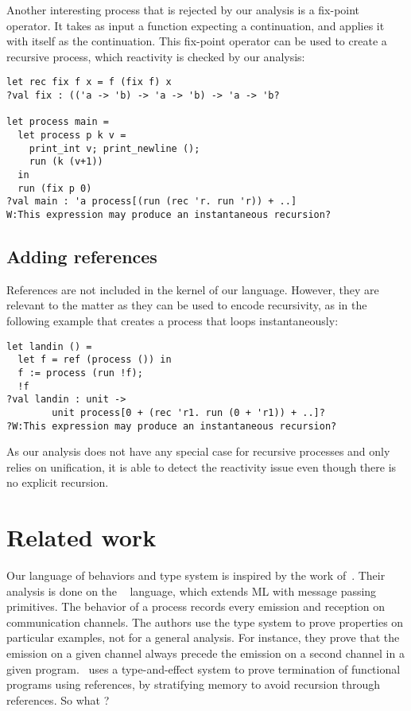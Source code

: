\documentclass[9pt,preprint]{sigplanconf}
\newcommand{\todo}[1]{ {\color{red} #1}}
\begin{document}
Another interesting process that is rejected by our analysis is a fix-point operator. It takes as input a function expecting a continuation, and applies it with itself as the continuation. This fix-point operator can be used to create a recursive process, which reactivity is checked by our analysis:
\begin{lstlisting}
let rec fix f x = f (fix f) x
?val fix : (('a -> 'b) -> 'a -> 'b) -> 'a -> 'b?

let process main =
  let process p k v =
    print_int v; print_newline (); 
    run (k (v+1))
  in
  run (fix p 0)
?val main : 'a process[(run (rec 'r. run 'r)) + ..]
W:This expression may produce an instantaneous recursion?
\end{lstlisting}

\subsection{Adding references}

References are not included in the kernel of our language. However, they are relevant to the matter as they can be used to encode recursivity, as in the following example that creates a process that loops instantaneously:
%
\begin{lstlisting}
let landin () =
  let f = ref (process ()) in
  f := process (run !f);
  !f
?val landin : unit -> 
        unit process[0 + (rec 'r1. run (0 + 'r1)) + ..]?
?W:This expression may produce an instantaneous recursion?
\end{lstlisting}
%
As our analysis does not have any special case for recursive processes and only relies on unification, it is able to detect the reactivity issue even though there is no explicit recursion.

\section{Related work}
\label{sec:related_work}


Our language of behaviors and type system is inspired by the work of~\cite{Amtoft:1999}. Their analysis is done on the \cml~\cite{Reppy:2007} language, which extends ML with message passing primitives. The behavior of a process records every emission and reception on communication channels. The authors use the type system to prove properties on particular examples, not for a general analysis. For instance, they prove that the emission on a given channel always precede the emission on a second channel in a given program. \cite{Boudol:2010}~uses a type-and-effect system to prove termination of functional programs using references, by stratifying memory to avoid recursion through references.\todo{So what ?}
\end{document}
